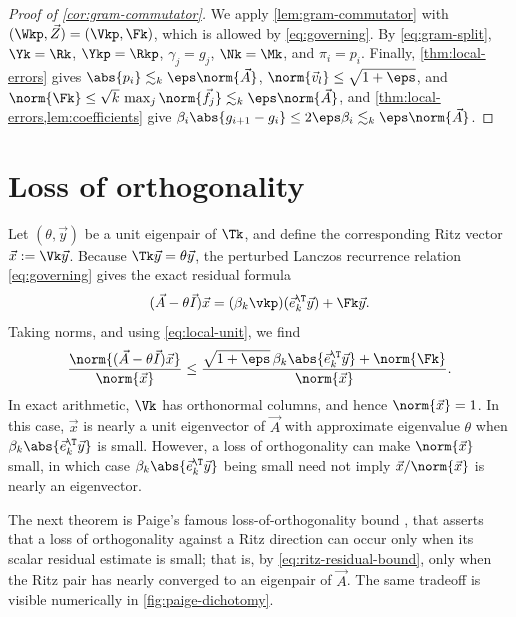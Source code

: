\begin{proof}[Proof of \cref{cor:gram-commutator}]
We apply \cref{lem:gram-commutator} with \((\Wkp,\vec Z)=(\Vkp,\Fk)\), which is allowed by \cref{eq:governing}.
By \cref{eq:gram-split}, \(\Yk=\Rk\), \(\Ykp=\Rkp\), \(\gamma_j=g_j\), \(\Nk=\Mk\), and \(\pi_i=p_i\).
Finally, \cref{thm:local-errors} gives \(\abs{p_i}\lesssim_k\eps\norm{\vec A}\), \(\norm{\vec v_l}\le\sqrt{1+\eps}\), and \(\norm{\Fk}\le\sqrt{k}\,\max_j\norm{\vec f_j}\lesssim_k\eps\norm{\vec A}\), and \cref{thm:local-errors,lem:coefficients} give \(\beta_i\abs{g_{i+1}-g_i}\le2\eps\beta_i\lesssim_k\eps\norm{\vec A}\).
\end{proof}



\section{Loss of orthogonality}
\label{sec:loss}

Let \((\theta,\vec y)\) be a unit eigenpair of \(\Tk\), and define the corresponding Ritz vector \(\vec x:=\Vk\vec y\).
Because \(\Tk\vec y=\theta\vec y\), the perturbed Lanczos recurrence relation \cref{eq:governing} gives the exact residual formula
\begin{equation}
 (\vec A-\theta\vec I)\vec x
 =(\beta_k\vkp)(\vec e_k^\T\vec y)+\Fk\vec y.
 \label{eq:ritz-residual-identity}
\end{equation}
Taking norms, and using \cref{eq:local-unit}, we find
\begin{equation}
 \frac{\norm{(\vec A-\theta\vec I)\vec x}}{\norm{\vec x}}
 \le \frac{\sqrt{1+\eps}\,\beta_k\abs{\vec e_k^\T\vec y}
      +\norm{\Fk}}{\norm{\vec x}}.
 \label{eq:ritz-residual-bound}
\end{equation}
In exact arithmetic, $\Vk$ has orthonormal columns, and hence $\norm{\vec x}=1$.
In this case, $\vec{x}$ is nearly a unit eigenvector of $\vec{A}$ with approximate eigenvalue $\theta$ when $\beta_k\abs{\vec e_k^\T\vec y}$ is small.
However, a loss of orthogonality can make \(\norm{\vec x}\) small, in which case $\beta_k\abs{\vec e_k^\T\vec y}$ being small need not imply $\vec{x}/\norm{\vec x}$ is nearly an eigenvector.

The next theorem is Paige's famous loss-of-orthogonality bound \cite[eqs.~(3.11)--(3.13)]{paige1980}, that asserts that a loss of orthogonality against a Ritz direction can occur only when its scalar residual estimate is small; that is, by \cref{eq:ritz-residual-bound}, only when the Ritz pair has nearly converged to an eigenpair of $\vec{A}$.
The same tradeoff is visible numerically in \cref{fig:paige-dichotomy}.


